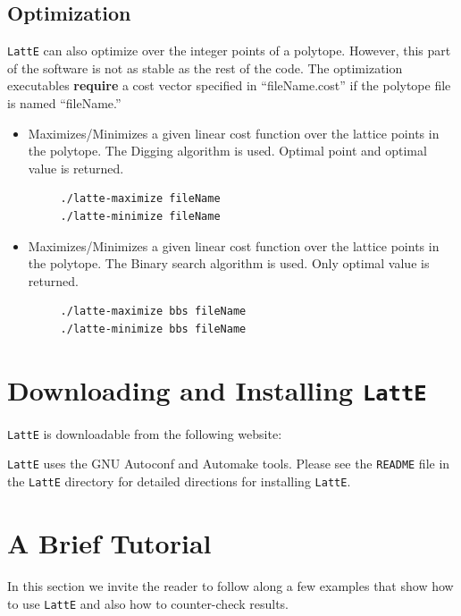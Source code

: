 \documentclass{article}
\newcommand{\latte}{{\tt LattE}\xspace}
\begin{document}
\subsection{Optimization}


\latte can also optimize over the integer points of a polytope. However, this part of the software is not as stable as the rest of the code. The optimization executables {\bf require} a cost vector specified in ``fileName.cost'' if the polytope file is named ``fileName.''

\begin{itemize}
\item Maximizes/Minimizes a given linear cost function over the lattice
  points in the polytope. The Digging algorithm
  \cite{latte3} is used. Optimal point and optimal value is returned. 
\begin{verbatim}
     ./latte-maximize fileName
     ./latte-minimize fileName
\end{verbatim} 
\item Maximizes/Minimizes a given linear cost function over the lattice
  points in the polytope. The Binary search
  algorithm is used. Only optimal value is returned. 
\begin{verbatim}
     ./latte-maximize bbs fileName
     ./latte-minimize bbs fileName
\end{verbatim} 
\end{itemize}




\section{Downloading and Installing {\tt LattE}}

{\tt LattE} is downloadable from the following website:




\latte uses the GNU Autoconf and Automake tools. Please see the {\tt README} file in the \latte directory for detailed directions for installing \latte.



\section{A Brief Tutorial}
In this section we invite the reader to follow along a few examples
that show how to use {\tt LattE} and also how to counter-check
results.
\end{document}
